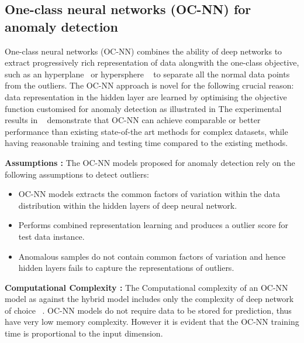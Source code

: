 \subsection{One-class neural networks (OC-NN) for anomaly detection}
\label{sec:oneclassNN}
One-class neural networks (OC-NN) combines the ability of deep networks to extract progressively rich representation of data alongwith the one-class objective, such as an hyperplane~\cite{chalapathy2018anomaly} or hypersphere ~\cite{ruff2018deep} to separate all the normal data points from the outliers. The OC-NN approach is novel for the following crucial reason: data representation in the hidden layer are learned by optimising the objective function customised for anomaly detection as illustrated in
The experimental results in ~\cite{chalapathy2018anomaly,ruff2018deep} demonstrate that OC-NN can achieve comparable or better performance than existing state-of-the art methods for complex datasets, while having reasonable training and testing time compared to the existing methods.

\textbf{Assumptions : } 
The OC-NN models proposed for anomaly detection rely on the  following assumptions to detect outliers:
\begin{itemize}
 \item  OC-NN models extracts the common factors of variation within the data distribution within the hidden layers of deep neural network.
  \item Performs combined representation learning and produces a outlier score for test data instance.
  \item Anomalous samples do not contain common factors of variation and hence hidden layers fails to capture the representations of outliers.
\end{itemize}

\textbf{Computational Complexity :} 
The Computational complexity of an OC-NN model as against the  hybrid model includes only the complexity of deep network of choice ~\cite{saxe2011random}. OC-NN models do not require  data to be
stored for prediction, thus have very low memory complexity. However  it is evident that the OC-NN training time is proportional to the input dimension.

